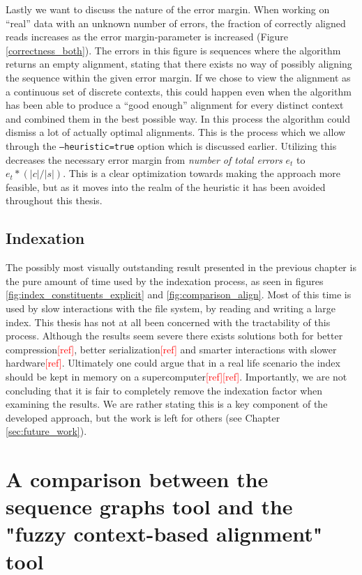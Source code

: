 \documentclass[thesis.tex]{subfiles}
\begin{document}
Lastly we want to discuss the nature of the error margin. When working on ``real'' data with an unknown number of errors, the fraction of correctly aligned reads increases as the error margin-parameter is increased (Figure \ref{correctness_both}). The errors in this figure is sequences where the algorithm returns an empty alignment, stating that there exists no way of possibly aligning the sequence within the given error margin. If we chose to view the alignment as a continuous set of discrete contexts, this could happen even when the algorithm has been able to produce a ``good enough'' alignment for every distinct context and combined them in the best possible way. In this process the algorithm could dismiss a lot of actually optimal alignments. This is the process which we allow through the \texttt{--heuristic=true} option which is discussed earlier. Utilizing this decreases the necessary error margin from \textit{number of total errors} $e_t$ to $e_t*(|c|/|s|)$. This is a clear optimization towards making the approach more feasible, but as it moves into the realm of the heuristic it has been avoided throughout this thesis.
\subsection*{Indexation}
The possibly most visually outstanding result presented in the previous chapter is the pure amount of time used by the indexation process, as seen in figures \ref{fig:index_constituents_explicit} and \ref{fig:comparison_align}. Most of this time is used by slow interactions with the file system, by reading and writing a large index. This thesis has not at all been concerned with the tractability of this process. Although the results seem severe there exists solutions both for better compression\textcolor{red}{[ref]}, better serialization\textcolor{red}{[ref]} and smarter interactions with slower hardware\textcolor{red}{[ref]}. Ultimately one could argue that in a real life scenario the index should be kept in memory on a supercomputer\textcolor{red}{[ref]}\textcolor{red}{[ref]}. Importantly, we are not concluding that it is fair to completely remove the indexation factor when examining the results. We are rather stating this is a key component of the developed approach, but the work is left for others (see Chapter \ref{sec:future_work}).
\section{A comparison between the sequence graphs tool and the "fuzzy context-based alignment" tool}
\end{document}
